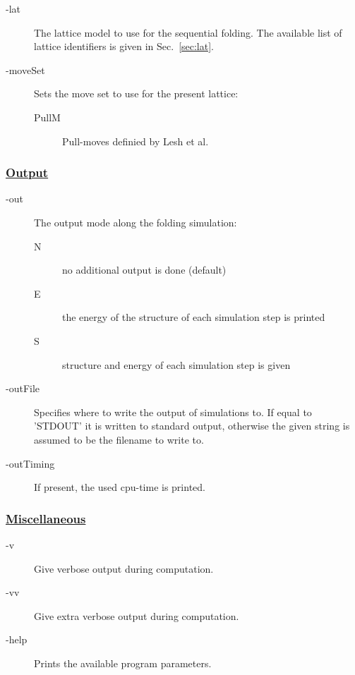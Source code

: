 \documentclass{article}
\begin{document}
\begin{description}
	\item[-lat] The lattice model to use for the sequential folding. The
	available list of lattice identifiers is given in Sec.~\ref{sec:lat}.
	\item[-moveSet] Sets the move set to use for the present lattice:
	\begin{description}
    	\item[PullM] Pull-moves definied by Lesh et al. \cite{Lesh:RECOMB2003}
    \end{description} 
\end{description}



\subsubsection*{\underline{ Output }}

\begin{description}
  \item[-out] The output mode along the folding simulation:
  \begin{description}
    \item[N] no additional output is done (default)
    \item[E] the energy of the structure of each simulation step is printed
    \item[S] structure and energy of each simulation step is given
  \end{description}
  \item[-outFile] Specifies where to write the output of simulations to. 
  		If equal to 'STDOUT' it is written to standard output, otherwise the 
  		given string is assumed to be the filename to write to.
  \item[-outTiming] If present, the used cpu-time is printed.
\end{description}


\subsubsection*{\underline{ Miscellaneous }}

\begin{description}
	\item[-v] Give verbose output during computation.
	\item[-vv] Give extra verbose output during computation.
	\item[-help] Prints the available program parameters.
\end{description}
\end{document}
